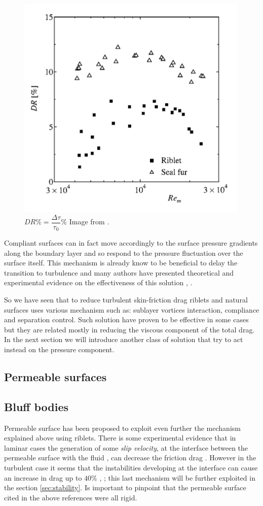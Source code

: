 \begin{figure}[h]
\centering
\includegraphics[width=0.5\linewidth]{chapter_1/seal}
\caption{$DR \% = \dfrac{ \Delta \tau}{\tau_{0}} \%$ Image from \citet{itoh2006turbulent}.}
\label{fig:seal}
\end{figure}


Compliant surfaces can in fact move accordingly to the surface pressure gradients along the boundary layer and so respond to the pressure fluctuation over the surface itself.
This mechanism is already know to be beneficial to delay the transition to turbulence and many authors have presented theoretical and experimental evidence on the effectiveness of this solution \cite{carpenter1990status}, \cite{bushnell1977effect}.

So we have seen that to reduce turbulent skin-friction drag riblets and natural surfaces uses various mechanism such as: sublayer vortices interaction, compliance and separation control.
Such solution have proven to be effective in some cases but they are related mostly in reducing the viscous component of the total drag.
In the next section we will introduce another class of solution that try to act instead on the pressure component.


\subsection{Permeable surfaces}

\subsection{Bluff bodies}

Permeable surface has been proposed to exploit even further the mechanism explained above using riblets.
There is some experimental evidence that in laminar cases the generation of some \textit{slip velocity}, at the interface between the permeable surface with the fluid , can decrease the friction drag \citet{beavers1967boundary}.
However in the turbulent case it seems that the instabilities developing at the interface can cause an increase in drag up to $40\%$ \citet{jimenez2001turbulent}, \citet{breugem2006influence}; this last mechanism will be further exploited in the section \ref{sec:stability}.
Is important to pinpoint that the permeable surface cited in the above references were all rigid.

